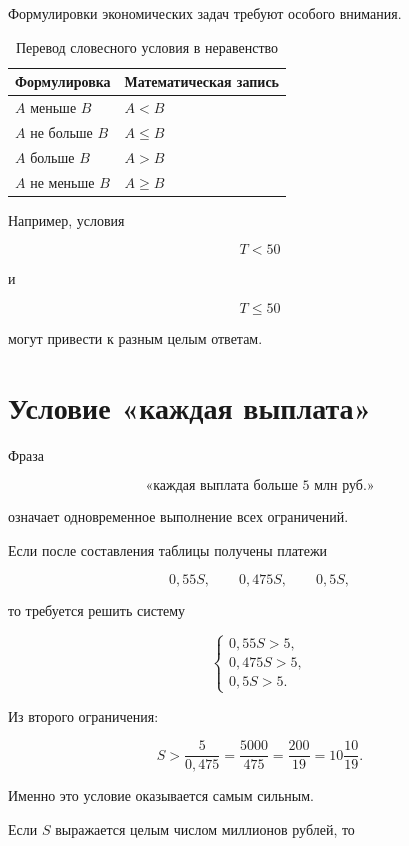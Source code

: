 \documentclass[a4paper,12pt]{article}
\begin{document}
Формулировки экономических задач требуют особого внимания.

\begin{table}[h]
\centering
\caption{Перевод словесного условия в неравенство}
\renewcommand{\arraystretch}{1.35}
\begin{tabular}{ll}
\toprule
Формулировка & Математическая запись \\
\midrule
\(A\) меньше \(B\) & \(A<B\) \\
\(A\) не больше \(B\) & \(A\le B\) \\
\(A\) больше \(B\) & \(A>B\) \\
\(A\) не меньше \(B\) & \(A\ge B\) \\
\bottomrule
\end{tabular}
\end{table}

Например, условия

\[
T<50
\]

и

\[
T\le50
\]

могут привести к разным целым ответам.


\section{Условие «каждая выплата»}

Фраза

\[
\text{«каждая выплата больше 5 млн руб.»}
\]

означает одновременное выполнение всех ограничений.

Если после составления таблицы получены платежи

\[
0{,}55S,\qquad
0{,}475S,\qquad
0{,}5S,
\]

то требуется решить систему

\[
\begin{cases}
0{,}55S>5,\\
0{,}475S>5,\\
0{,}5S>5.
\end{cases}
\]

Из второго ограничения:

\[
S>
\frac{5}{0{,}475}
=
\frac{5000}{475}
=
\frac{200}{19}
=
10\frac{10}{19}.
\]

Именно это условие оказывается самым сильным.

Если \(S\) выражается целым числом миллионов рублей, то
\end{document}
